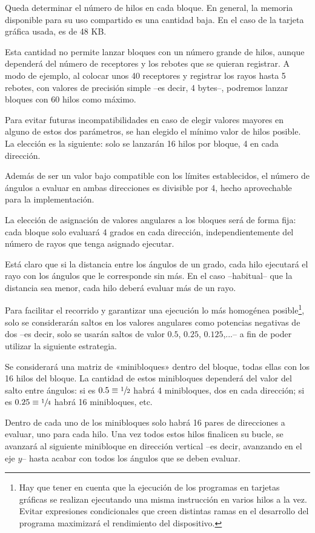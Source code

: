 Queda determinar el número de hilos en cada bloque.
En general, la memoria disponible para su uso compartido es una cantidad baja.
En el caso de la tarjeta gráfica usada, es de 48 KB\cite{Nvidia}.

Esta cantidad no permite lanzar bloques con un número grande de hilos, aunque dependerá del número de receptores y los rebotes que se quieran registrar.
A modo de ejemplo, al colocar unos 40 receptores y registrar los rayos hasta 5 rebotes, con valores de precisión simple --es decir, 4 bytes--, podremos lanzar bloques con 60 hilos como máximo.

Para evitar futuras incompatibilidades en caso de elegir valores mayores en alguno de estos dos parámetros, se han elegido el mínimo valor de hilos posible.
La elección es la siguiente: solo se lanzarán 16 hilos por bloque, 4 en cada dirección.

Además de ser un valor bajo compatible con los límites establecidos, el número de ángulos a evaluar en ambas direcciones es divisible por 4, hecho aprovechable para la implementación.

La elección de asignación de valores angulares a los bloques será de forma fija: cada bloque solo evaluará 4 grados en cada dirección, independientemente del número de rayos que tenga asignado ejecutar.

Está claro que si la distancia entre los ángulos de un grado, cada hilo ejecutará el rayo con los ángulos que le corresponde sin más.
En el caso --habitual-- que la distancia sea menor, cada hilo deberá evaluar más de un rayo.

Para facilitar el recorrido y garantizar una ejecución lo más homogénea posible\footnote{Hay que tener en cuenta que la ejecución de los programas en tarjetas gráficas se realizan ejecutando una misma instrucción en varios hilos a la vez. Evitar expresiones condicionales que creen distintas ramas en el desarrollo del programa maximizará el rendimiento del dispositivo.}, solo se considerarán saltos en los valores angulares como potencias negativas de dos --es decir, solo se usarán saltos de valor $0.5$, $0.25$, $0.125$,...-- a fin de poder utilizar la siguiente estrategia.

Se considerará una matriz de «minibloques» dentro del bloque, todas ellas con los 16 hilos del bloque.
La cantidad de estos minibloques dependerá del valor del salto entre ángulos: si es $0.5 \equiv \sfrac{1}{2}$ habrá 4 minibloques, dos en cada dirección; si es $0.25 \equiv \sfrac{1}{4}$ habrá 16 minibloques, etc.

Dentro de cada uno de los minibloques solo habrá 16 pares de direcciones a evaluar, uno para cada hilo.
Una vez todos estos hilos finalicen su bucle, se avanzará al siguiente minibloque en dirección vertical --es decir, avanzando en el eje $y$-- hasta acabar con todos los ángulos que se deben evaluar.